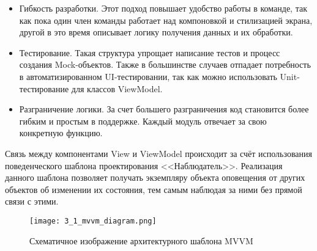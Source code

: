 \begin{itemize}
    \item Гибкость разработки.
    Этот подход повышает удобство работы в команде, так как пока один член команды работает над компоновкой и стилизацией экрана, другой в это время описывает логику получения данных и их обработки.
    \item Тестирование.
    Такая структура упрощает написание тестов и процесс создания Mock-объектов.
    Также в большинстве случаев отпадает потребность в автоматизированном UI-тестировании, так как можно использовать Unit-тестирование для классов ViewModel.
    \item Разграничение логики.
    За счет большего разграничения код становится более гибким и простым в поддержке.
    Каждый модуль отвечает за свою конкретную функцию.
\end{itemize}

Связь между компонентами View и ViewModel происходит за счёт использования поведенческого шаблона проектирования <<Наблюдатель>>.
Реализация данного шаблона позволяет получать экземпляру объекта оповещения от других объектов об изменении их состояния, тем самым наблюдая за ними без прямой связи с этими.

\begin{figure}[H]
    \centering
    \texttt{[image: 3\_1\_mvvm\_diagram.png]}
    \caption{Схематичное изображение архитектурного шаблона MVVM}
    \label{fig:design:architecture:mvvm}
\end{figure}